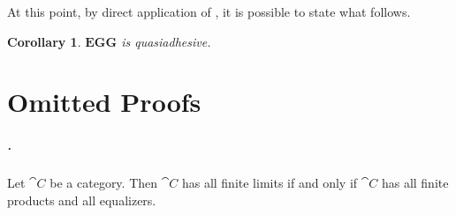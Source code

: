 \documentclass[a4paper, twoside,openright]{report}
\theoremstyle{plain}
\newtheorem{cor}[theorem]{Corollary}
\theoremstyle{definition}
\begin{document}
At this point, by direct application of , it is possible to state what follows.

\begin{cor}
    $\mathbf{EGG}$ is quasiadhesive.
\end{cor}


\appendix


\chapter{Omitted Proofs}

\paragraph{.}
 Let $\cat C$ be a category. Then $\cat C$ has all finite limits if and only if $\cat C$ has all finite products and all equalizers.
\end{document}
